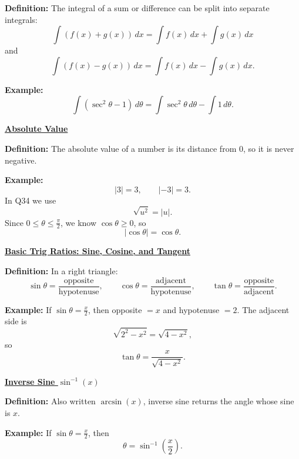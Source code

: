 \documentclass{article}
\newcommand{\defanchor}[1]{\hypertarget{def:#1}{}}
\newcommand{\backtoterm}[2]{\hyperlink{q:#1}{\textbf{#2}}}
\begin{document}
    \textbf{Definition:}
    The integral of a sum or difference can be split into separate integrals:
    \[
    \int (f(x)+g(x))\,dx=\int f(x)\,dx + \int g(x)\,dx
    \]
    and
    \[
    \int (f(x)-g(x))\,dx=\int f(x)\,dx - \int g(x)\,dx.
    \]

    \textbf{Example:}
    \[
    \int (\sec^2\theta-1)\,d\theta
    =
    \int \sec^2\theta\,d\theta-\int 1\,d\theta.
    \]

    \defanchor{abs-val}\backtoterm{abs-val}{Absolute Value}

    \textbf{Definition:}
    The absolute value of a number is its distance from $0$, so it is never negative.

    \textbf{Example:}
    \[
    |3|=3,\qquad |-3|=3.
    \]
    In Q34 we use
    \[
    \sqrt{u^2}=|u|.
    \]
    Since $0\le \theta \le \frac{\pi}{2}$, we know $\cos\theta\ge 0$, so
    \[
    |\cos\theta|=\cos\theta.
    \]

    \defanchor{trig-ratios}\backtoterm{trig-ratios}{Basic Trig Ratios: Sine, Cosine, and Tangent}

    \textbf{Definition:}
    In a right triangle:
    \[
    \sin\theta=\frac{\text{opposite}}{\text{hypotenuse}},\qquad
    \cos\theta=\frac{\text{adjacent}}{\text{hypotenuse}},\qquad
    \tan\theta=\frac{\text{opposite}}{\text{adjacent}}.
    \]

    \textbf{Example:}
    If $\sin\theta=\frac{x}{2}$, then opposite $=x$ and hypotenuse $=2$.
    The adjacent side is
    \[
    \sqrt{2^2-x^2}=\sqrt{4-x^2},
    \]
    so
    \[
    \tan\theta=\frac{x}{\sqrt{4-x^2}}.
    \]

    \defanchor{inv-sine}\backtoterm{inv-sine}{Inverse Sine $\sin^{-1}(x)$}

    \textbf{Definition:}
    Also written $\arcsin(x)$, inverse sine returns the angle whose sine is $x$.

    \textbf{Example:}
    If $\sin\theta=\frac{x}{2}$, then
    \[
    \theta=\sin^{-1}\!\left(\frac{x}{2}\right).
    \]
\end{document}
